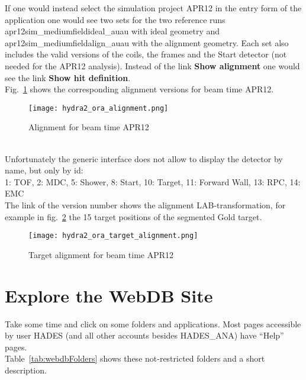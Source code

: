 If one would instead select the simulation project APR12 in the entry form of the application one would see two sets for 
the two reference runs apr12sim\_mediumfieldideal\_auau with ideal geometry and apr12sim\_mediumfieldalign\_auau with the 
alignment geometry. Each set also includes the valid versions of the coils, the frames and the Start detector (not needed 
for the APR12 analysis). Instead of the link \textbf{Show alignment} one would see the link \textbf{Show hit definition}.\\

Fig.~\ref{fig:oraAlignment} shows the corresponding alignment versions for beam time APR12.
\begin{figure}[\htb]
  \centering
  \texttt{[image: hydra2\_ora\_alignment.png]}
  \caption[Alignment for beam time APR12]
          {Alignment for beam time APR12}
  \label{fig:oraAlignment}
\end{figure} ~\\
Unfortunately the generic interface does not allow to display the detector by name, but only by id:\\
1: TOF, 2: MDC, 5: Shower, 8: Start, 10: Target, 11: Forward Wall, 13: RPC, 14: EMC\\ 

The link of the version number shows the alignment LAB-transformation, for example in fig.~\ref{fig:oraTargetAlignment} 
the 15 target positions of the segmented Gold target.
\begin{figure}[\htb]
  \centering
  \texttt{[image: hydra2\_ora\_target\_alignment.png]}
  \caption[Traget alignment for beam time APR12]
          {Target alignment for beam time APR12}
  \label{fig:oraTargetAlignment}
\end{figure}
\clearpage


\section[Explore the WebDB Site]{Explore the WebDB Site}

Take some time and click on some folders and applications. Most pages accessible by user HADES (and all other accounts 
besides HADES\_ANA) have ``Help'' pages.\\

Table~\ref{tab:webdbFolders} shows these not-restricted folders and a short description.

